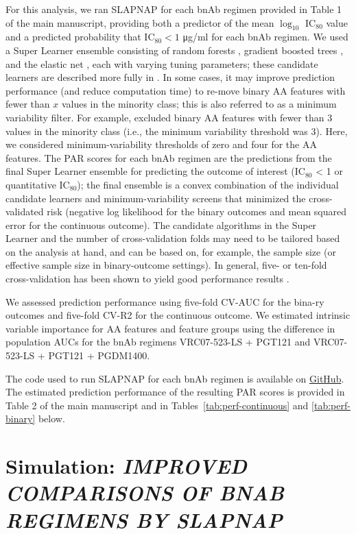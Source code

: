 \documentclass[10pt]{article}
\begin{document}
For this analysis, we ran SLAPNAP \citep{williamson2021} for each bnAb regimen provided in Table 1 of the main manuscript, providing both a predictor of the mean $\log_{10}$ IC$_{80}$ value and a predicted probability that IC$_{80} < 1$ \si{\ug}/ml for each bnAb regimen. We used a Super Learner ensemble consisting of random forests \citep{breiman2001}, gradient boosted trees \citep{friedman2001}, and the elastic net \citep{zou2005}, each with varying tuning parameters; these candidate learners are described more fully in \citet{williamson2021}. In some cases, it may improve prediction performance (and reduce computation time) to re-move binary AA features with fewer than $x$ values in the minority class; this is also referred to as a minimum variability filter. For example, \citet{magaret2019} excluded binary AA features with fewer than 3 values in the minority class (i.e., the minimum variability threshold was 3). Here, we considered minimum-variability thresholds of zero and four for the AA features. The PAR scores for each bnAb regimen are the predictions from the final Super Learner ensemble for predicting the outcome of interest (IC$_{80}$ < 1 or quantitative IC$_{80}$); the final ensemble is a convex combination of the individual candidate learners and minimum-variability screens that minimized the cross-validated risk (negative log likelihood for the binary outcomes and mean squared error for the continuous outcome). The candidate algorithms in the Super Learner and the number of cross-validation folds may need to be tailored based on the analysis at hand, and can be based on, for example, the sample size (or effective sample size in binary-outcome settings). In general, five- or ten-fold cross-validation has been shown to yield good performance results \citep{benkeser2020}.

We assessed prediction performance using five-fold CV-AUC for the bina-ry outcomes and five-fold CV-R2 for the continuous outcome. We estimated intrinsic variable importance for AA features and feature groups using the difference in population AUCs for the bnAb regimens VRC07-523-LS + PGT121 and VRC07-523-LS + PGT121 + PGDM1400. 

The code used to run SLAPNAP for each bnAb regimen is available on \href{https://www.github.com/bdwilliamson/clinical_slapnap}{GitHub}. The estimated prediction performance of the resulting PAR scores is provided in Table 2 of the main manuscript and in Tables~\ref{tab:perf-continuous} and \ref{tab:perf-binary} below. 

\section{Simulation: \textit{IMPROVED COMPARISONS OF BNAB REGIMENS BY SLAPNAP}}\label{sec:var_reduce}
\end{document}
